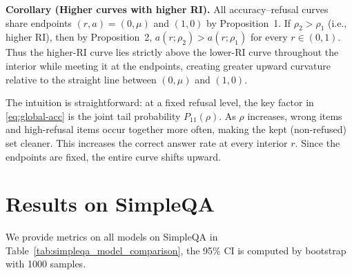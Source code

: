 \textbf{Corollary (Higher curves with higher RI).}
All accuracy--refusal curves share endpoints \((r,a)=(0,\mu)\) and \((1,0)\) by Proposition~1.
If \(\rho_2>\rho_1\) (i.e., higher RI), then by Proposition~2,
\(
a(r;\rho_2)>a(r;\rho_1)
\)
for every \(r\in(0,1)\).
Thus the higher-RI curve lies strictly above the lower-RI curve throughout the interior while meeting it at the endpoints, creating greater upward curvature relative to the straight line between \((0,\mu)\) and \((1,0)\).

The intuition is straightforward: at a fixed refusal level, the key factor in \eqref{eq:global-acc} is the joint tail probability \(P_{11}(\rho)\).
As \(\rho\) increases, wrong items and high-refusal items occur together more often, making the kept (non-refused) set cleaner. This increases the correct answer rate at every interior \(r\).
Since the endpoints are fixed, the entire curve shifts upward.


\section{Results on SimpleQA}
\label{sec:simpleqa_evaluation}

We provide metrics on all models on SimpleQA in Table~\ref{tab:simpleqa_model_comparison}, the 95\% CI is computed by bootstrap with 1000 samples.

